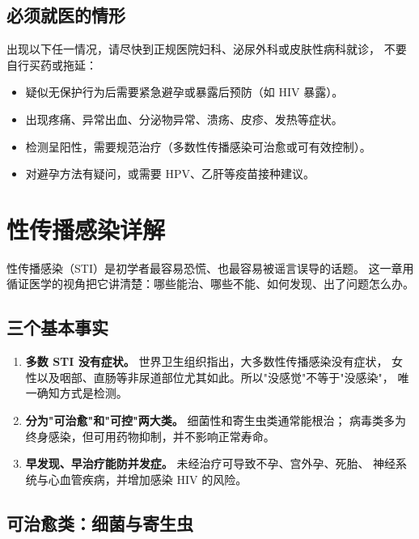 \documentclass[12pt,UTF8,openany]{ctexbook}
\begin{document}
\section{必须就医的情形}

出现以下任一情况，请尽快到正规医院妇科、泌尿外科或皮肤性病科就诊，
不要自行买药或拖延：

\begin{itemize}
  \item 疑似无保护行为后需要紧急避孕或暴露后预防（如 HIV 暴露）。
  \item 出现疼痛、异常出血、分泌物异常、溃疡、皮疹、发热等症状。
  \item 检测呈阳性，需要规范治疗（多数性传播感染可治愈或可有效控制）。
  \item 对避孕方法有疑问，或需要 HPV、乙肝等疫苗接种建议。
\end{itemize}

\chapter{性传播感染详解}
\label{chap:sti}

性传播感染（STI）是初学者最容易恐慌、也最容易被谣言误导的话题。
这一章用循证医学的视角把它讲清楚：哪些能治、哪些不能、如何发现、出了问题怎么办。

\section{三个基本事实}

\begin{enumerate}[leftmargin=2em,itemsep=0.3em]
  \item \textbf{多数 STI 没有症状。} 世界卫生组织指出，大多数性传播感染没有症状，
        女性以及咽部、直肠等非尿道部位尤其如此。所以"没感觉"不等于"没感染"，
        唯一确知方式是检测。
  \item \textbf{分为"可治愈"和"可控"两大类。} 细菌性和寄生虫类通常能根治；
        病毒类多为终身感染，但可用药物抑制，并不影响正常寿命。
  \item \textbf{早发现、早治疗能防并发症。} 未经治疗可导致不孕、宫外孕、死胎、
        神经系统与心血管疾病，并增加感染 HIV 的风险。
\end{enumerate}

\section{可治愈类：细菌与寄生虫}
\end{document}
